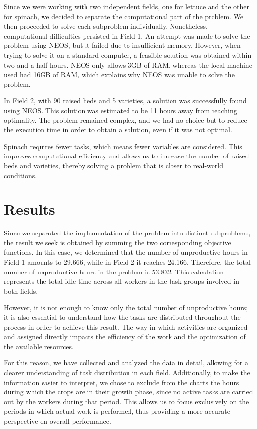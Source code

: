 Since we were working with two independent fields, one for lettuce and the other for spinach, we decided to separate the computational part of the problem.  
We then proceeded to solve each subproblem individually. Nonetheless, computational difficulties persisted in Field 1.  
An attempt was made to solve the problem using NEOS, but it failed due to insufficient memory. However, when trying to solve it on a standard computer,  
a feasible solution was obtained within two and a half hours.  
NEOS only allows 3GB of RAM, whereas the local machine used had 16GB of RAM, which explains why NEOS was unable to solve the problem.


In Field 2, with 90 raised beds and 5 varieties, a solution was successfully found using NEOS.  
This solution was estimated to be 11 hours away from reaching optimality. The problem remained complex, and we had no choice  
but to reduce the execution time in order to obtain a solution, even if it was not optimal.

Spinach requires fewer tasks, which means fewer variables are considered. This improves computational efficiency and allows us  
to increase the number of raised beds and varieties, thereby solving a problem that is closer to real-world conditions.

\chapter*{Results}
Since we separated the implementation of the problem into distinct subproblems, the result we seek is obtained by summing the two corresponding objective functions.  
In this case, we determined that the number of unproductive hours in Field 1 amounts to 29.666, while in Field 2 it reaches 24.166.  
Therefore, the total number of unproductive hours in the problem is 53.832. This calculation represents the total idle time across all workers  
in the task groups involved in both fields.

However, it is not enough to know only the total number of unproductive hours; it is also essential to understand how the tasks are distributed throughout the process in order to achieve this result.  
The way in which activities are organized and assigned directly impacts the efficiency of the work and the optimization of the available resources.

For this reason, we have collected and analyzed the data in detail, allowing for a clearer understanding of task distribution in each field.  
Additionally, to make the information easier to interpret, we chose to exclude from the charts the hours during which the crops are in their growth phase,  
since no active tasks are carried out by the workers during that period. This allows us to focus exclusively on the periods in which actual work is performed,  
thus providing a more accurate perspective on overall performance.

